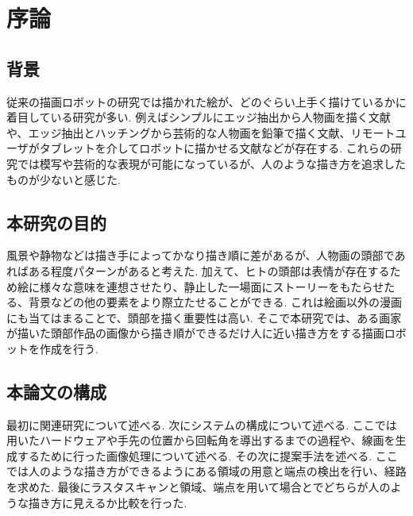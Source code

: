 \chapter{序論}
  \label{chap:intro}
  \section{背景}
    \label{sec:background}
	従来の描画ロボットの研究では描かれた絵が、どのぐらい上手く描けているかに着目している研究が多い. 例えばシンプルにエッジ抽出から人物画を描く文献\cite{1}や、エッジ抽出とハッチングから芸術的な人物画を鉛筆で描く文献\cite{2}、リモートユーザがタブレットを介してロボットに描かせる文献\cite{3}などが存在する. これらの研究では模写や芸術的な表現が可能になっているが、人のような描き方を追求したものが少ないと感じた.
  \section{本研究の目的}
    \label{sec:target}
	風景や静物などは描き手によってかなり描き順に差があるが、人物画の頭部であればある程度パターンがあると考えた.  加えて、ヒトの頭部は表情が存在するため絵に様々な意味を連想させたり、静止した一場面にストーリーをもたらせたる、背景などの他の要素をより際立たせることができる. これは絵画以外の漫画にも当てはまることで、頭部を描く重要性は高い.	そこで本研究では、ある画家が描いた頭部作品の画像から描き順ができるだけ人に近い描き方をする描画ロボットを作成を行う.\\
	

	\section{本論文の構成}
    \label{sec:construction_of_this_paper}
	最初に関連研究について述べる. 次にシステムの構成について述べる. ここでは用いたハードウェアや手先の位置から回転角を導出するまでの過程や、線画を生成するために行った画像処理について述べる. その次に提案手法を述べる. ここでは人のような描き方ができるようにある領域の用意と端点の検出を行い、経路を求めた. 最後にラスタスキャンと領域、端点を用いて場合とでどちらが人のような描き方に見えるか比較を行った.
    
